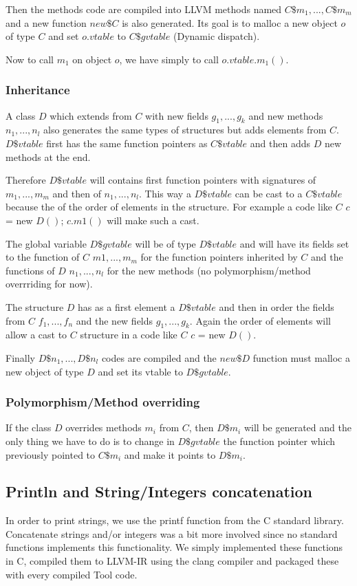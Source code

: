 Then the methods code are compiled into LLVM methods named $C\$m_1, ..., C\$m_m$ and a new function $new\$C$ is also generated. Its goal is to malloc a new object $o$ of type $C$ and  set $o.vtable$ to $C\$gvtable$ (Dynamic dispatch).

Now to call $m_1$ on object $o$, we have simply to call $o.vtable.m_1()$.

\subsubsection{Inheritance}
A class $D$ which extends from $C$ with new fields $g_1, ..., g_k$ and new methods $n_1, ..., n_l$ also generates the same types of structures but adds elements from $C$. $D\$vtable$ first has the same function pointers as $C\$vtable$ and then adds $D$ new methods at the end.

 Therefore $D\$vtable$ will contains first function pointers with signatures of $m_1, ..., m_m$ and then of $n_1, ..., n_l$. This way a $D\$vtable$ can be cast to a $C\$vtable$ because the of the order of elements in the structure. For example a code like $C$ $c$ = new $D()$; $c.m1()$ will make such a cast.

The global variable $D\$gvtable$ will be of type $D\$vtable$ and will have its fields set to the function of $C$ $m1, ..., m_m$ for the function pointers inherited by $C$ and the functions of $D$ $n_1, ..., n_l$ for the new methods (no polymorphism/method overrriding for now).

The structure $D$ has as a first element a $D\$vtable$ and then in order the fields from $C$ $f_1, ..., f_n$ and the new fields $g_1, ..., g_k$. Again the order of elements will allow a cast to $C$ structure in a code like $C$ $c$ = new $D()$.

Finally $D\$n_1, ..., D\$n_l$ codes are compiled and the $new\$D$ function must malloc a new object of type $D$ and set its vtable to $D\$gvtable$.

\subsubsection{Polymorphism/Method overriding}
If the class $D$ overrides methods $m_i$ from $C$, then $D\$m_i$ will be generated and the only thing we have to do is to change in $D\$gvtable$ the function pointer which previously pointed to $C\$m_i$ and make it points to $D\$m_i$.

\subsection{Println and String/Integers concatenation}
In order to print strings, we use the printf function from the C standard library. Concatenate strings and/or integers was a bit more involved since no standard functions implements this functionality. We simply implemented these functions in C, compiled them to LLVM-IR using the clang compiler and packaged these with every compiled Tool code.

